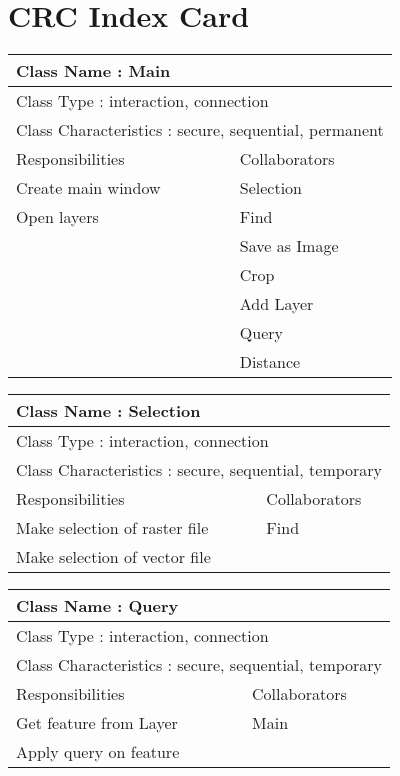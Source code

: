 \section{CRC Index Card}
\begin{tabular}{|l|l|}
  \hline
  \multicolumn{2}{|l|}{ Class Name : Main} \\
  \hline
  \multicolumn{2}{|l|}{ Class Type : interaction, connection} \\
  \hline
  \multicolumn{2}{|l|}{ Class Characteristics : secure, sequential, permanent} \\
  \hline
  Responsibilities & Collaborators  \\
  \hline
  Create main window & Selection \\
  Open layers & Find \\
   & Save as Image\\
   & Crop \\
   & Add Layer \\
   & Query \\
   & Distance \\
  \hline
\end{tabular}

\begin{tabular}{|l|l|}
  \hline
  \multicolumn{2}{|l|}{ Class Name :   Selection} \\
  \hline
  \multicolumn{2}{|l|}{ Class Type : interaction, connection} \\
  \hline
  \multicolumn{2}{|l|}{ Class Characteristics : secure, sequential, temporary} \\
  \hline
  Responsibilities & Collaborators  \\
  \hline
  Make selection of raster file & Find \\
  Make selection of vector file & \\
  \hline
\end{tabular}

\begin{tabular}{|l|l|}
  \hline
  \multicolumn{2}{|l|}{ Class Name : Query} \\
  \hline
  \multicolumn{2}{|l|}{ Class Type : interaction, connection} \\
  \hline
  \multicolumn{2}{|l|}{ Class Characteristics : secure, sequential, temporary} \\
  \hline
  Responsibilities & Collaborators  \\
  \hline
  Get feature from Layer  & Main\\
  Apply query on feature & \\
  \hline
\end{tabular}

